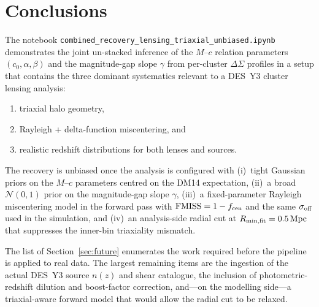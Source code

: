 \documentclass[11pt,a4paper]{article}
\newcommand{\sigmaoff}{\sigma_{\rm off}}
\newcommand{\fcen}{f_{\rm cen}}
\newcommand{\dsig}{\Delta\Sigma}
\newcommand{\Rmin}{R_{\rm min,fit}}
\begin{document}
\section{Conclusions}

The notebook
\texttt{combined\_recovery\_lensing\_triaxial\_unbiased.ipynb} demonstrates
the joint un-stacked inference of the $M$--$c$ relation parameters
$(c_0, \alpha, \beta)$ and the magnitude-gap slope $\gamma$ from per-cluster
$\dsig$ profiles in a setup that contains the three dominant systematics
relevant to a DES~Y3 cluster lensing analysis:
\begin{enumerate}[noitemsep]
  \item triaxial halo geometry,
  \item Rayleigh + delta-function miscentering, and
  \item realistic redshift distributions for both lenses and sources.
\end{enumerate}

The recovery is unbiased once the analysis is configured with
(i)~tight Gaussian priors on the $M$--$c$ parameters centred on the DM14
expectation, (ii)~a broad $\mathcal{N}(0, 1)$ prior on the magnitude-gap slope
$\gamma$, (iii)~a fixed-parameter Rayleigh miscentering model in the forward
pass with $\mathrm{FMISS}=1-\fcen$ and the same $\sigmaoff$ used in the
simulation, and (iv)~an analysis-side radial cut at $\Rmin = 0.5\,\mathrm{Mpc}$
that suppresses the inner-bin triaxiality mismatch.

The list of Section~\ref{sec:future} enumerates the work required before the
pipeline is applied to real data.  The largest remaining items are the
ingestion of the actual DES~Y3 source $n(z)$ and shear catalogue, the
inclusion of photometric-redshift dilution and boost-factor correction,
and—on the modelling side—a triaxial-aware forward model that would allow
the radial cut to be relaxed.
\end{document}
